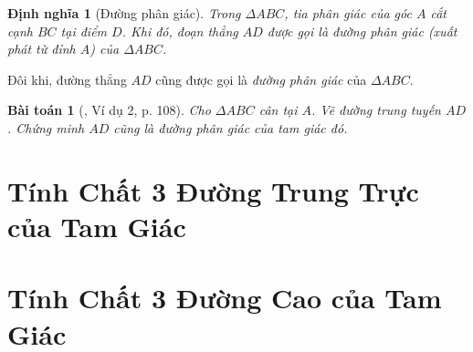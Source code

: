 \documentclass{article}
\newtheorem{baitoan}{Bài toán}
\newtheorem{dinhnghia}{Định nghĩa}
\begin{document}
\begin{dinhnghia}[Đường phân giác]
	Trong $\Delta ABC$, tia phân giác của góc $A$ cắt cạnh $BC$ tại điểm $D$. Khi đó, đoạn thẳng $AD$ được gọi là \emph{đường phân giác} (xuất phát từ đỉnh $A$) của $\Delta ABC$.
\end{dinhnghia}
Đôi khi, đường thẳng $AD$ cũng được gọi là \textit{đường phân giác} của $\Delta ABC$.

\begin{baitoan}[\cite{SGK_Toan_7_Canh_Dieu_tap_2}, Ví dụ 2, p. 108]
	Cho $\Delta ABC$ cân tại $A$. Vẽ đường trung tuyến $AD$. Chứng minh $AD$ cũng là đường phân giác của tam giác đó.
\end{baitoan}


\section{Tính Chất 3 Đường Trung Trực của Tam Giác}


\section{Tính Chất 3 Đường Cao của Tam Giác}


\printbibliography[heading=bibintoc]
	
\end{document}
